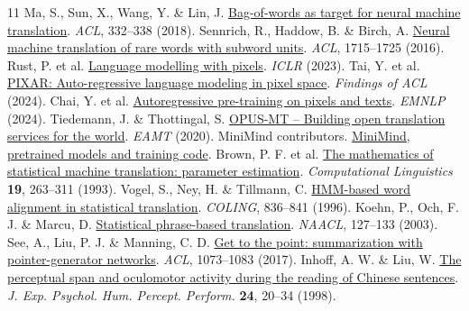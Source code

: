 \documentclass[10pt,a4paper]{article}
\begin{document}
{\footnotesize
\begin{thebibliography}{11}\setlength{\itemsep}{0pt}
 Ma, S., Sun, X., Wang, Y. \& Lin, J. \href{https://aclanthology.org/P18-2053/}{Bag-of-words as target for neural machine translation}. \textit{ACL}, 332--338 (2018).
 Sennrich, R., Haddow, B. \& Birch, A. \href{https://aclanthology.org/P16-1162/}{Neural machine translation of rare words with subword units}. \textit{ACL}, 1715--1725 (2016).
 Rust, P. et al. \href{https://arxiv.org/abs/2207.06991}{Language modelling with pixels}. \textit{ICLR} (2023).
 Tai, Y. et al. \href{https://aclanthology.org/2024.findings-acl.874/}{PIXAR: Auto-regressive language modeling in pixel space}. \textit{Findings of ACL} (2024).
 Chai, Y. et al. \href{https://aclanthology.org/2024.emnlp-main.182/}{Autoregressive pre-training on pixels and texts}. \textit{EMNLP} (2024).
 Tiedemann, J. \& Thottingal, S. \href{https://aclanthology.org/2020.eamt-1.61/}{OPUS-MT -- Building open translation services for the world}. \textit{EAMT} (2020).
 MiniMind contributors. \href{https://github.com/jingyaogong/minimind/tree/858008eb98da4428f78053a1cc4d3a3bd5973629}{MiniMind, pretrained models and training code}.
 Brown, P. F. et al. \href{https://aclanthology.org/J93-2003/}{The mathematics of statistical machine translation: parameter estimation}. \textit{Computational Linguistics} \textbf{19}, 263--311 (1993).
 Vogel, S., Ney, H. \& Tillmann, C. \href{https://aclanthology.org/C96-2141/}{HMM-based word alignment in statistical translation}. \textit{COLING}, 836--841 (1996).
 Koehn, P., Och, F. J. \& Marcu, D. \href{https://aclanthology.org/N03-1017/}{Statistical phrase-based translation}. \textit{NAACL}, 127--133 (2003).
 See, A., Liu, P. J. \& Manning, C. D. \href{https://aclanthology.org/P17-1099/}{Get to the point: summarization with pointer-generator networks}. \textit{ACL}, 1073--1083 (2017).
 Inhoff, A. W. \& Liu, W. \href{https://pubmed.ncbi.nlm.nih.gov/9483822/}{The perceptual span and oculomotor activity during the reading of Chinese sentences}. \textit{J. Exp. Psychol. Hum. Percept. Perform.} \textbf{24}, 20--34 (1998).
\end{thebibliography}}
\end{document}
